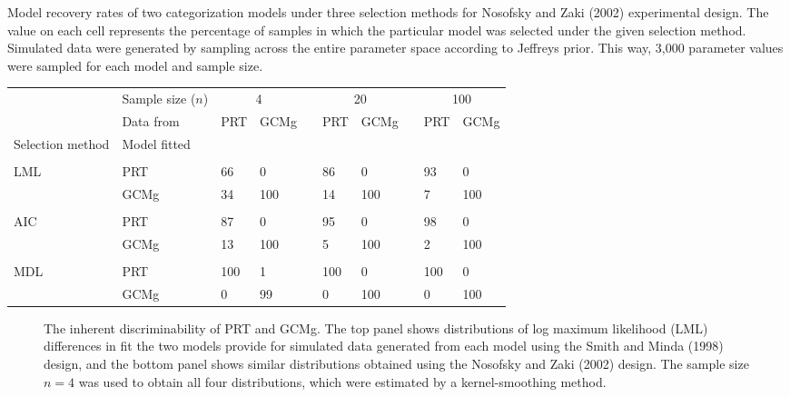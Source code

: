 \documentclass[11pt]{article}
\begin{document}
\newpage


 Model recovery rates of two categorization models under three selection
methods for Nosofsky and Zaki (2002) experimental design. The value on each cell represents the
percentage of samples in which the particular model was selected under the given selection method.
Simulated data were generated by sampling across the entire parameter space according to Jeffreys
prior. This way, 3,000 parameter values were sampled for each model and sample size. \vskip
0.150in
\begin{center}
\begin{tabular}{llllllllll} \hline
& \multicolumn{1}{l}{Sample size ($n$)} & \multicolumn{2}{c}{4} & & \multicolumn{2}{c}{20} & &
\multicolumn{2}{c}{100} \\ \cline{3-4} \cline{6-7} \cline{9-10} &
\multicolumn{1}{l}{Data  from}  & PRT & GCMg & & PRT & GCMg & & PRT & GCMg  \\
\hline Selection method & Model fitted \\\\
LML & PRT & 66 & 0  &  & 86& 0 & & 93 & 0 \\
& GCMg & 34 & 100 & & 14 & 100 & & 7 & 100 \\ \\
AIC & PRT & 87 & 0 & & 95 & 0 & &  98 & 0 \\
& GCMg & 13 & 100 & & 5 & 100 &  & 2 & 100 \\\\
MDL & PRT & 100 & 1 & &  100 & 0 & & 100 & 0 \\
& GCMg & 0 & 99 & & 0 & 100 & & 0 & 100 \\ \hline
\end{tabular}
\end{center}


\begin{figure}
\begin{center}\scriptsize
{} \caption{The inherent discriminability of PRT and GCMg. The top
panel shows distributions of log maximum likelihood (LML) differences in fit the two models
provide for simulated data generated from each model using the Smith and Minda (1998) design, and
the bottom panel shows similar distributions obtained using the Nosofsky and Zaki (2002) design.
The sample size $n = 4$ was used to obtain all four distributions, which were estimated by a
kernel-smoothing method. } \label{fig:sn4x}
\end{center}
\end{figure}
\end{document}
